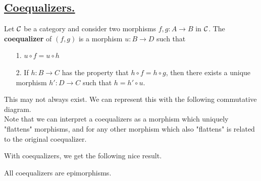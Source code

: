     \subsection*{\underline{Coequalizers.}}
    \begin{definition}
    Let $\mathcal{C}$ be a category and consider two morphisms $f, g: A \to
    B$ in $\mathcal{C}$. The \textbf{coequalizer} of $(f, g)$ is a
    morphism $u: B \to D$ such that 
    \begin{itemize}
        \item[1.] $u \circ f = u \circ h$
        \item[2.] If $h: B \to C$ has the property that $h \circ f
        = h \circ g$, then there exists a unique morphism $h':D \to C$ such that 
        $h = h' \circ u$.  
    \end{itemize}
    This may not always exist. 
    We can represent this with the following commutative diagram.\\ 
    \textcolor{NavyBlue}{Note that
    we can interpret a coequalizers as a morphism which uniquely
    "flattens" morphisms, and for any other morphism which also
    "flattens" is related to the original coequalizer.}
    \begin{center}
    \end{center}
    \end{definition}

    With coequalizers, we get the following nice result. 
    \begin{lemma}
    All coequalizers are epimorphisms.
    \end{lemma}

